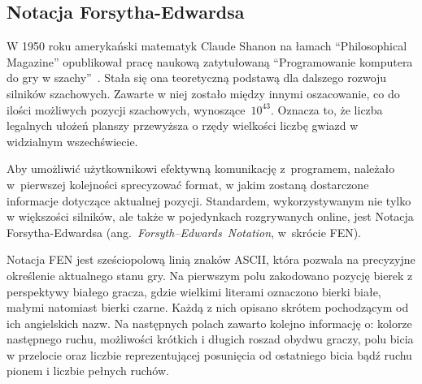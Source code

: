 \subsection{Notacja Forsytha-Edwardsa}
\label{subsec:notacja-fen}


W 1950 roku amerykański matematyk Claude Shanon na łamach \enquote{Philosophical Magazine} opublikował pracę naukową zatytułowaną \enquote{Programowanie komputera do gry w szachy}~\cite*{Shannon1950XXIIPA}.
Stała się ona teoretyczną podstawą dla dalszego rozwoju silników szachowych.
Zawarte w niej zostało między innymi oszacowanie, co do ilości możliwych pozycji szachowych, wynoszące~$10^{43}$.
Oznacza to, że liczba legalnych ułożeń planszy przewyższa o rzędy wielkości liczbę gwiazd w widzialnym wszechświecie.

Aby umożliwić użytkownikowi efektywną komunikację z~programem, należało w~pierwszej kolejności sprecyzować format, w jakim zostaną dostarczone informacje dotyczące aktualnej pozycji.
Standardem, wykorzystywanym nie tylko w większości silników, ale także w pojedynkach rozgrywanych online, jest Notacja Forsytha-Edwardsa (ang.~\emph{Forsyth–Edwards~Notation}, w~skrócie FEN).

Notacja FEN jest sześciopolową linią znaków ASCII, która pozwala na precyzyjne określenie aktualnego stanu gry.
Na pierwszym polu zakodowano pozycję bierek z perspektywy białego gracza, gdzie wielkimi literami oznaczono bierki białe, małymi natomiast bierki czarne.
Każdą z nich opisano skrótem pochodzącym od ich angielskich nazw.
Na następnych polach zawarto kolejno informację o: kolorze następnego ruchu, możliwości krótkich i długich roszad obydwu graczy, polu bicia w przelocie oraz liczbie reprezentującej posunięcia od ostatniego bicia bądź ruchu pionem i liczbie pełnych ruchów.

